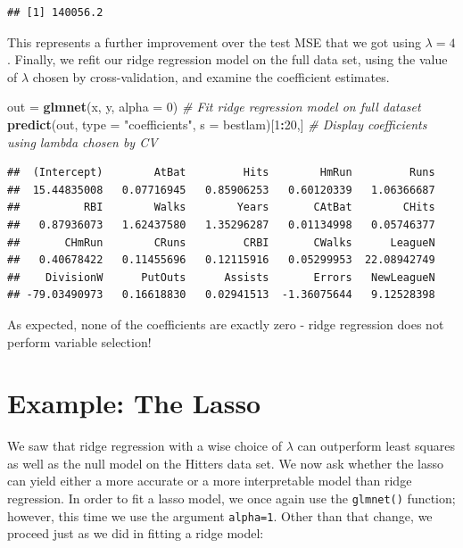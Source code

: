 \documentclass[openany]{book}
\newenvironment{Shaded}{\begin{snugshade}}{\end{snugshade}}
\newcommand{\CommentTok}[1]{\textcolor[rgb]{0.56,0.35,0.01}{\textit{#1}}}
\newcommand{\DataTypeTok}[1]{\textcolor[rgb]{0.13,0.29,0.53}{#1}}
\newcommand{\DecValTok}[1]{\textcolor[rgb]{0.00,0.00,0.81}{#1}}
\newcommand{\KeywordTok}[1]{\textcolor[rgb]{0.13,0.29,0.53}{\textbf{#1}}}
\newcommand{\NormalTok}[1]{#1}
\newcommand{\OperatorTok}[1]{\textcolor[rgb]{0.81,0.36,0.00}{\textbf{#1}}}
\newcommand{\StringTok}[1]{\textcolor[rgb]{0.31,0.60,0.02}{#1}}
\begin{document}
\begin{verbatim}
## [1] 140056.2
\end{verbatim}

This represents a further improvement over the test MSE that we got using
\(\lambda = 4\). Finally, we refit our ridge regression model on the full data set,
using the value of \(\lambda\) chosen by cross-validation, and examine the coefficient
estimates.

\begin{Shaded}
\begin{Highlighting}[]
\NormalTok{out =}\StringTok{ }\KeywordTok{glmnet}\NormalTok{(x, y, }\DataTypeTok{alpha =} \DecValTok{0}\NormalTok{) }\CommentTok{# Fit ridge regression model on full dataset}
\KeywordTok{predict}\NormalTok{(out, }\DataTypeTok{type =} \StringTok{"coefficients"}\NormalTok{, }\DataTypeTok{s =}\NormalTok{ bestlam)[}\DecValTok{1}\OperatorTok{:}\DecValTok{20}\NormalTok{,] }\CommentTok{# Display coefficients using lambda chosen by CV}
\end{Highlighting}
\end{Shaded}

\begin{verbatim}
##  (Intercept)        AtBat         Hits        HmRun         Runs 
##  15.44835008   0.07716945   0.85906253   0.60120339   1.06366687 
##          RBI        Walks        Years       CAtBat        CHits 
##   0.87936073   1.62437580   1.35296287   0.01134998   0.05746377 
##       CHmRun        CRuns         CRBI       CWalks      LeagueN 
##   0.40678422   0.11455696   0.12115916   0.05299953  22.08942749 
##    DivisionW      PutOuts      Assists       Errors   NewLeagueN 
## -79.03490973   0.16618830   0.02941513  -1.36075644   9.12528398
\end{verbatim}

As expected, none of the coefficients are exactly zero - ridge regression does not
perform variable selection!

\hypertarget{example-the-lasso}{%
\section{Example: The Lasso}\label{example-the-lasso}}

We saw that ridge regression with a wise choice of \(\lambda\) can outperform least
squares as well as the null model on the Hitters data set. We now ask
whether the lasso can yield either a more accurate or a more interpretable
model than ridge regression. In order to fit a lasso model, we once again
use the \texttt{glmnet()} function; however, this time we use the argument \texttt{alpha=1}.
Other than that change, we proceed just as we did in fitting a ridge model:
\end{document}

